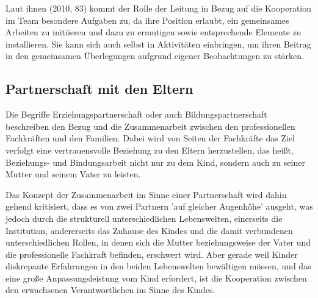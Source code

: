 Laut ihnen (2010, 83) kommt der Rolle der Leitung in Bezug auf die Kooperation im Team besondere Aufgaben zu, da ihre Position erlaubt, ein gemeinsames Arbeiten zu initiieren und dazu zu ermutigen sowie entsprechende Elemente zu installieren. Sie kann sich auch selbst in Aktivitäten einbringen, um ihren Beitrag in den gemeinsamen Überlegungen aufgrund eigener Beobachtungen zu stärken.

\subsection{Partnerschaft mit den Eltern}
Die Begriffe Erziehungspartnerschaft oder auch Bildungspartnerschaft beschreiben den Bezug und die Zusammenarbeit zwischen den professionellen Fachkräften und den Familien. Dabei wird von Seiten der Fachkräfte das Ziel verfolgt eine vertrauensvolle Beziehung zu den Eltern herzustellen, das heißt, Beziehungs- und Bindungsarbeit nicht nur zu dem Kind, sondern auch zu seiner Mutter und seinem Vater zu leisten. 

Das Konzept der Zusammenarbeit im Sinne einer Partnerschaft wird dahin gehend kritisiert, dass es von zwei Partnern 'auf gleicher Augenhöhe' ausgeht, was jedoch durch die strukturell unterschiedlichen Lebenswelten, einerseits die Institution, andererseits das Zuhause des Kindes und die damit verbundenen unterschiedlichen Rollen, in denen sich die Mutter beziehungsweise der Vater und die professionelle Fachkraft befinden, erschwert wird. Aber gerade weil Kinder diskrepante Erfahrungen in den beiden Lebenswelten bewältigen müssen, und das eine große Anpassungsleistung vom Kind erfordert, ist die Kooperation zwischen den erwachsenen Verantwortlichen im Sinne des Kindes. 

